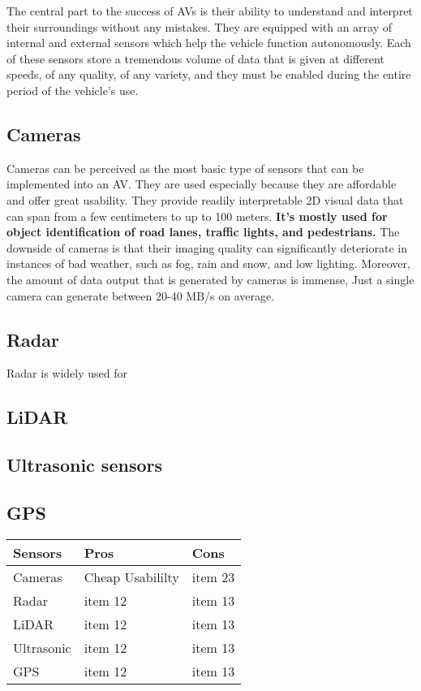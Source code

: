 \documentclass[10pt,oneside,english,a4paper]{article}
\begin{document}
\indent The central part to the success of AVs is their ability to understand and interpret their surroundings without any mistakes. They are equipped with an array of internal and external sensors which help the vehicle function autonomously. Each of these sensors store a tremendous volume of data that is given at different speeds, of any quality, of any variety, and they must be enabled during the entire period of the vehicle's use\cite{zdroj2}. 

\subsection{Cameras}

\indent Cameras can be perceived as the most basic type of sensors that can be implemented into an AV. They are used especially because they are affordable and offer great usability. They provide readily interpretable 2D visual data that can span from a few centimeters to up to 100 meters\cite{zdroj2}. \textbf{ It's mostly used for object identification of road lanes, traffic lights, and pedestrians.} The downside of cameras is that their imaging quality can significantly deteriorate in instances of bad weather, such as fog, rain and snow, and low lighting. Moreover, the amount of data output that is generated by cameras is immense, Just a single camera can generate between 20-40 MB/s on average\cite{zdroj2}.

\subsection{Radar}
Radar is widely used for 

\subsection{LiDAR}

\subsection{Ultrasonic sensors}

\subsection{GPS}

\begin{tabularx}{0.9\textwidth} { 
  | >{\centering\arraybackslash}X 
  | >{\centering\arraybackslash}X 
  | >{\centering\arraybackslash}X | }
 \hline
 Sensors & Pros & Cons \\
 \hline
 Cameras  & Cheap \newline Usabililty& item 23  \\
 \hline
 Radar & item 12 & item 13 \\
 \hline
 LiDAR & item 12 & item 13 \\
 \hline
 Ultrasonic & item 12 & item 13 \\
 \hline
 GPS & item 12 & item 13 \\
\hline
\end{tabularx}
\end{document}
